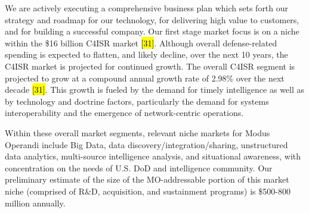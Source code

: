 \documentclass{sbir}
\begin{document}
We are actively executing a comprehensive business plan which sets forth our strategy and roadmap for our technology, for delivering high value to customers, and for building a successful company. Our first stage market focus is on a niche within the \$16 billion C4ISR market \hl{[31]}. Although overall defense-related spending is expected to flatten, and likely decline, over the next 10 years, the C4ISR market is projected for continued growth. The overall C4ISR segment is projected to grow at a compound annual growth rate of 2.98\% over the next decade \hl{[31]}. This growth is fueled by the demand for timely intelligence as well as by technology and doctrine factors, particularly the demand for systems interoperability and the emergence of network-centric operations.


Within these overall market segments, relevant niche markets for Modus Operandi include Big Data, data discovery/integration/sharing, unstructured data analytics, multi-source intelligence analysis, and situational awareness, with concentration on the needs of U.S. DoD and intelligence community. Our preliminary estimate of the size of the MO-addressable portion of this market niche (comprised of R\&D, acquisition, and sustainment programs) is \$500-800 million annually.
\end{document}
